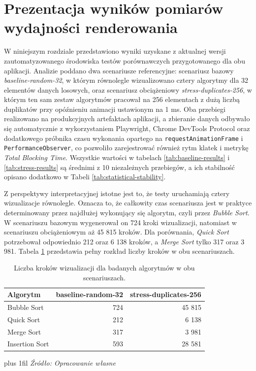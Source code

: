 \documentclass[12pt,openright,twoside]{report}
\newcommand{\source}[1]{{\par\vspace{5pt}\noindent\leftskip=0pt \rightskip=0pt \parfillskip=0pt plus 1fil \footnotesize\textit{Źródło: #1}\par}}
\begin{document}
\section{Prezentacja wyników pomiarów wydajności renderowania}
W niniejszym rozdziale przedstawiono wyniki uzyskane z aktualnej wersji zautomatyzowanego środowiska testów porównawczych przygotowanego dla obu aplikacji. Analizie poddano dwa scenariusze referencyjne: scenariusz bazowy \textit{baseline-random-32}, w którym równolegle wizualizowano cztery algorytmy dla 32 elementów danych losowych, oraz scenariusz obciążeniowy \textit{stress-duplicates-256}, w którym ten sam zestaw algorytmów pracował na 256 elementach z dużą liczbą duplikatów przy opóźnieniu animacji ustawionym na 1 ms. Oba przebiegi realizowano na produkcyjnych artefaktach aplikacji, a zbieranie danych odbywało się automatycznie z wykorzystaniem Playwright, Chrome DevTools Protocol oraz dodatkowego próbnika czasu wykonania opartego na \texttt{requestAnimationFrame} i \texttt{PerformanceObserver}, co pozwoliło zarejestrować również rytm klatek i metrykę \textit{Total Blocking Time}. Wszystkie wartości w tabelach \ref{tab:baseline-results} i \ref{tab:stress-results} są średnimi z 10 niezależnych przebiegów, a ich stabilność opisano dodatkowo w Tabeli \ref{tab:statistical-stability}.

Z perspektywy interpretacyjnej istotne jest to, że testy uruchamiają cztery wizualizacje równolegle. Oznacza to, że całkowity czas scenariusza jest w praktyce determinowany przez najdłużej wykonujący się algorytm, czyli przez \textit{Bubble Sort}. W scenariuszu bazowym wygenerował on 724 kroki wizualizacji, natomiast w scenariuszu obciążeniowym aż 45 815 kroków. Dla porównania, \textit{Quick Sort} potrzebował odpowiednio 212 oraz 6 138 kroków, a \textit{Merge Sort} tylko 317 oraz 3 981. Tabela \ref{tab:step-counts} przedstawia pełny rozkład liczby kroków w obu scenariuszach.

\begin{table}[H]
\centering
\caption{Liczba kroków wizualizacji dla badanych algorytmów w obu scenariuszach.}
\label{tab:step-counts}
\begin{tabular}{|l|r|r|}
\hline
\textbf{Algorytm} & \textbf{baseline-random-32} & \textbf{stress-duplicates-256} \\
\hline
Bubble Sort & 724 & 45 815 \\
Quick Sort & 212 & 6 138 \\
Merge Sort & 317 & 3 981 \\
Insertion Sort & 593 & 28 581 \\
\hline
\end{tabular}
\source{Opracowanie własne}
\end{table}
\end{document}
